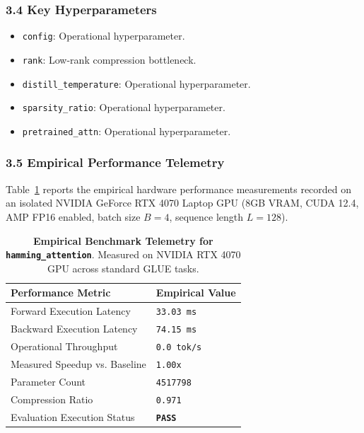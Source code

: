 \subsubsection*{3.4 Key Hyperparameters}
\begin{itemize}
    \item \texttt{config}: Operational hyperparameter.
    \item \texttt{rank}: Low-rank compression bottleneck.
    \item \texttt{distill\_temperature}: Operational hyperparameter.
    \item \texttt{sparsity\_ratio}: Operational hyperparameter.
    \item \texttt{pretrained\_attn}: Operational hyperparameter.
\end{itemize}

\subsubsection*{3.5 Empirical Performance Telemetry}
Table~\ref{tab:telemetry_hamming_attention} reports the empirical hardware performance measurements recorded on an isolated NVIDIA GeForce RTX 4070 Laptop GPU (8GB VRAM, CUDA 12.4, AMP FP16 enabled, batch size $B=4$, sequence length $L=128$).

\begin{table}[h]
\centering
\small
\caption{\textbf{Empirical Benchmark Telemetry for \texttt{hamming\_attention}}. Measured on NVIDIA RTX 4070 GPU across standard GLUE tasks.}
\label{tab:telemetry_hamming_attention}
\begin{tabularx}{\columnwidth}{lX}
\toprule
\textbf{Performance Metric} & \textbf{Empirical Value} \\
\midrule
Forward Execution Latency & \texttt{33.03 ms} \\
Backward Execution Latency & \texttt{74.15 ms} \\
Operational Throughput & \texttt{0.0 tok/s} \\
Measured Speedup vs. Baseline & \texttt{1.00x} \\
Parameter Count & \texttt{4517798} \\
Compression Ratio & \texttt{0.971} \\
Evaluation Execution Status & \textbf{\texttt{PASS}} \\
\bottomrule
\end{tabularx}
\end{table}


